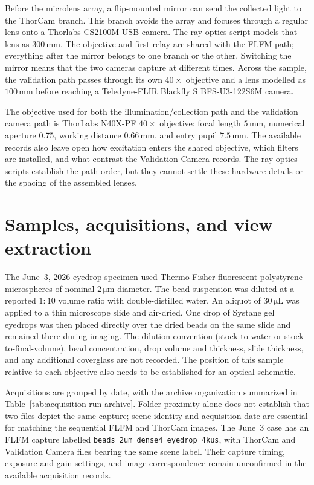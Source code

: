 Before the microlens array, a flip-mounted mirror can send the collected light
to the ThorCam branch. This branch avoids the array and focuses through a
regular lens onto a Thorlabs CS2100M-USB camera. The ray-optics script models
that lens as $300\,\mathrm{mm}$. The objective and first relay are shared
with the FLFM path; everything after the mirror belongs to one branch or the
other. Switching the mirror means that the two cameras capture at different
times. Across the sample, the validation path passes through its own
$40\times$ objective and a lens modelled as $100\,\mathrm{mm}$ before
reaching a Teledyne-FLIR Blackfly S BFS-U3-122S6M camera.

The objective used for both the illumination/collection path and the validation camera path is ThorLabs N40X-PF $40\times$ objective: focal length
$5\,\mathrm{mm}$, numerical aperture 0.75, working distance
$0.66\,\mathrm{mm}$, and entry pupil $7.5\,\mathrm{mm}$. The
available records also leave open how excitation enters the shared objective,
which filters are installed, and what contrast the Validation Camera records.
The ray-optics scripts establish the path order, but they cannot settle these
hardware details or the spacing of the assembled lenses.

\section{Samples, acquisitions, and view extraction}
\label{sec:sample-acquisition}

The June~3, 2026 eyedrop specimen used Thermo Fisher fluorescent polystyrene
microspheres of nominal $2\,\mathrm{\mu m}$ diameter. The bead suspension was
diluted at a reported $1{:}10$ volume ratio with double-distilled water.
An aliquot of $30\,\mathrm{\mu L}$ was applied to a thin microscope slide and
air-dried. One drop of Systane gel eyedrops was then placed directly over the
dried beads on the same slide and remained there during imaging. The dilution
convention (stock-to-water or stock-to-final-volume), bead concentration,
drop volume and thickness, slide thickness, and any additional coverglass are
not recorded. The position of this sample relative to each objective also
needs to be established for an optical schematic.

Acquisitions are grouped by date, with the archive organization summarized in
Table~\ref{tab:acquisition-run-archive}. Folder proximity alone does not
establish that two files depict the same capture; scene identity and
acquisition date are essential for matching the sequential FLFM and ThorCam
images. The June~3 case has an FLFM
capture labelled \texttt{beads\_2um\_dense4\_eyedrop\_4kus}, with ThorCam and
Validation Camera files bearing the same scene label. Their capture timing,
exposure and gain settings, and image correspondence remain unconfirmed in
the available acquisition records.

